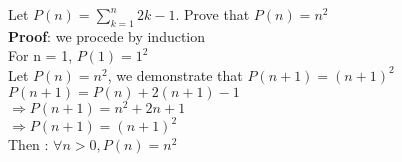 \documentclass{article}
\begin{document}
\noindent Let $P(n) = \sum_{k=1}^{n}{2k - 1}$. Prove that $P(n) = n^2$\\
\noindent \textbf{Proof}: we procede by induction\\
For n = 1, $P(1) = 1^2$\\
Let $P(n) = n^2$, we demonstrate that $P(n + 1) = (n + 1)^2$\\
$P(n + 1) = P(n) + 2(n + 1) - 1$\\
$\Rightarrow P(n + 1) = n^2 + 2n + 1$\\
$\Rightarrow P(n + 1) = (n + 1)^2$\\
Then : $\forall n > 0, P(n) = n^2$\\
\end{document}
